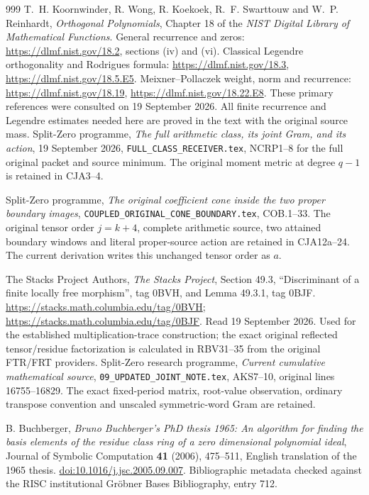 \documentclass[11pt,a4paper]{article}
\begin{document}
\begin{thebibliography}{999}
T.~H. Koornwinder, R. Wong, R. Koekoek, R.~F. Swarttouw and
W.~P. Reinhardt, \emph{Orthogonal Polynomials}, Chapter 18 of the
\emph{NIST Digital Library of Mathematical Functions}.
General recurrence and zeros: \url{https://dlmf.nist.gov/18.2},
sections (iv) and (vi).
Classical Legendre orthogonality and Rodrigues formula:
\url{https://dlmf.nist.gov/18.3},
\url{https://dlmf.nist.gov/18.5.E5}.
Meixner--Pollaczek weight, norm and recurrence:
\url{https://dlmf.nist.gov/18.19},
\url{https://dlmf.nist.gov/18.22.E8}.
These primary references were consulted on 19 September 2026.
All finite recurrence and Legendre estimates needed here are
proved in the text with the original source mass.
Split-Zero programme,
\emph{The full arithmetic class, its joint Gram, and its action},
19 September 2026, \texttt{FULL\_CLASS\_RECEIVER.tex},
NCRP1--8 for the full original packet and source minimum.
The original moment metric at degree \(q-1\) is retained in CJA3--4.

Split-Zero programme,
\emph{The original coefficient cone inside the two proper boundary images},
\texttt{COUPLED\_ORIGINAL\_CONE\_BOUNDARY.tex}, COB.1--33.
The original tensor order \(j=k+4\), complete arithmetic source,
two attained boundary windows and literal proper-source action are
retained in CJA12a--24. The current derivation writes this unchanged
tensor order as \(a\).


The Stacks Project Authors, \emph{The Stacks Project},
Section 49.3, ``Discriminant of a finite locally free morphism'',
tag 0BVH, and Lemma 49.3.1, tag 0BJF.
\url{https://stacks.math.columbia.edu/tag/0BVH};
\url{https://stacks.math.columbia.edu/tag/0BJF}.
Read 19 September 2026. Used for the established multiplication-trace
construction; the exact original reflected tensor/residue factorization
is calculated in RBV31--35 from the original FTR/FRT providers.
Split-Zero research programme,
\emph{Current cumulative mathematical source},
\texttt{09\_UPDATED\_JOINT\_NOTE.tex}, AKS7--10,
original lines 16755--16829.
The exact fixed-period matrix, root-value observation, ordinary
transpose convention and unscaled symmetric-word Gram are retained.

B. Buchberger,
\emph{Bruno Buchberger's PhD thesis 1965:
An algorithm for finding the basis elements of the residue class ring
of a zero dimensional polynomial ideal},
Journal of Symbolic Computation \textbf{41} (2006), 475--511,
English translation of the 1965 thesis.
\href{https://doi.org/10.1016/j.jsc.2005.09.007}
{doi:10.1016/j.jsc.2005.09.007}.
Bibliographic metadata checked against the RISC institutional
Gr\"obner Bases Bibliography, entry 712.


\end{thebibliography}
\end{document}
